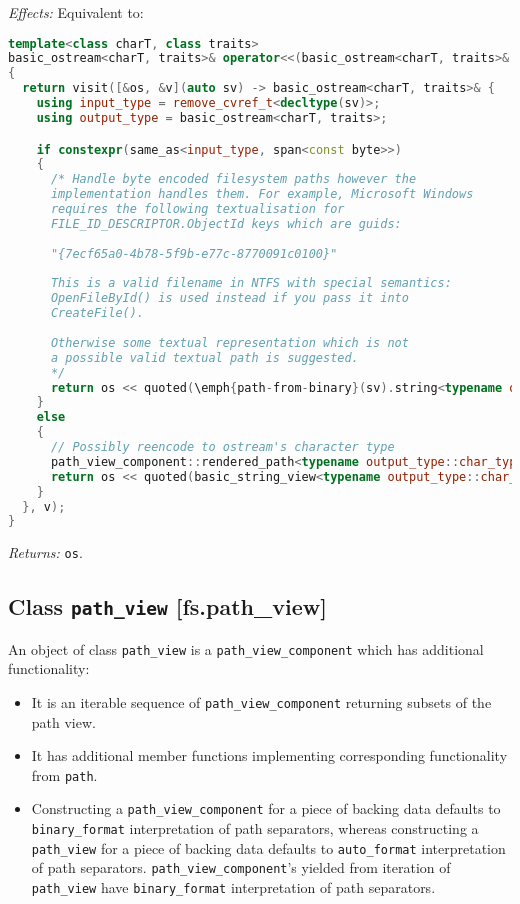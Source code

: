 \documentclass[11pt]{article}
\newcommand{\code}[2][cpp]{\lstinline[language=#1,basicstyle=\small\ttfamily]{#2}}
\newcommand{\desc}[1]{\textit{#1}}
\newcommand{\effects}{\desc{Effects: }}
\newcommand{\returns}{\desc{Returns: }}
\begin{document}
\effects Equivalent to:\begin{lstlisting}[language=cpp]
template<class charT, class traits>
basic_ostream<charT, traits>& operator<<(basic_ostream<charT, traits>& os, path_view_component v)
{
  return visit([&os, &v](auto sv) -> basic_ostream<charT, traits>& {
    using input_type = remove_cvref_t<decltype(sv)>;
    using output_type = basic_ostream<charT, traits>;

    if constexpr(same_as<input_type, span<const byte>>)
    {
      /* Handle byte encoded filesystem paths however the
      implementation handles them. For example, Microsoft Windows
      requires the following textualisation for
      FILE_ID_DESCRIPTOR.ObjectId keys which are guids:
      
      "{7ecf65a0-4b78-5f9b-e77c-8770091c0100}"
      
      This is a valid filename in NTFS with special semantics:
      OpenFileById() is used instead if you pass it into
      CreateFile().
      
      Otherwise some textual representation which is not
      a possible valid textual path is suggested.
      */
      return os << quoted(\emph{path-from-binary}(sv).string<typename output_type::char_type>());
    }
    else
    {
      // Possibly reencode to ostream's character type
      path_view_component::rendered_path<typename output_type::char_type> zbuff(v, path_view_component::unterminated);
      return os << quoted(basic_string_view<typename output_type::char_type>(zbuff.buffer, zbuff.length));
    }
  }, v);
}
\end{lstlisting}

\returns \code{os}.\\

\subsection*{Class \code{path_view} [fs.path\_view]}

An object of class \code{path_view} is a \code{path_view_component} which has additional functionality:
\begin{itemize}
    \item It is an iterable sequence of \code{path_view_component} returning subsets of the path view.
    \item It has additional member functions implementing corresponding functionality from \code{path}.
    \item Constructing a \code{path_view_component} for a piece of backing data defaults to \code{binary_format} interpretation of path separators, whereas constructing a \code{path_view} for a piece of backing data defaults to \code{auto_format} interpretation of path separators. \code{path_view_component}'s yielded from iteration of \code{path_view} have \code{binary_format} interpretation of path separators.
\end{itemize}
\end{document}

